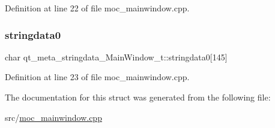 Definition at line 22 of file moc\+\_\+mainwindow.\+cpp.

\mbox{\label{structqt__meta__stringdata___main_window__t_a87f8ccab1c2ccd9d86188ffea0918941}} 
\subsubsection{\texorpdfstring{stringdata0}{stringdata0}}
{\footnotesize\ttfamily char qt\+\_\+meta\+\_\+stringdata\+\_\+\+Main\+Window\+\_\+t\+::stringdata0\mbox{[}145\mbox{]}}



Definition at line 23 of file moc\+\_\+mainwindow.\+cpp.



The documentation for this struct was generated from the following file\+:\begin{DoxyCompactItemize}
\item 
src/\mbox{\hyperlink{moc__mainwindow_8cpp}{moc\+\_\+mainwindow.\+cpp}}\end{DoxyCompactItemize}
